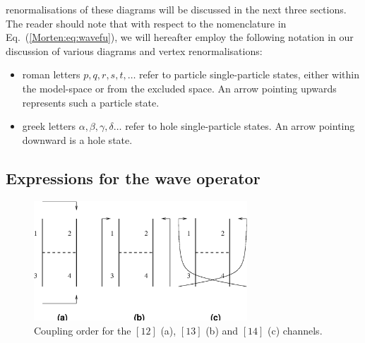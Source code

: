 renormalisations of these diagrams will be discussed
in the next three sections.
The reader should note that with respect to
the nomenclature in Eq.~(\ref{Morten:eq:wavefu}), we will hereafter 
employ the following notation in our discussion of various diagrams
and vertex renormalisations:
\begin{itemize}
\item roman letters $p,q,r,s,t,\dots$ refer to particle single-particle
states, either
within the model-space or from the excluded space. An arrow pointing
upwards represents such a particle state. 
\item greek letters $\alpha ,\beta ,\gamma ,\delta \dots$ refer to hole
single-particle states. An arrow pointing downward is a hole state.
\end{itemize}


\subsection{Expressions for the wave operator}

\begin{figure}%
	\begin{center}
      	\includegraphics[width=8cm]{recouple.eps}
	\end{center}

      \caption{Coupling order for the $[12]$ (a), $[13]$ (b) and
               $[14]$ (c) channels.}
      \label{Morten:fig:channelsdef}
\end{figure}


